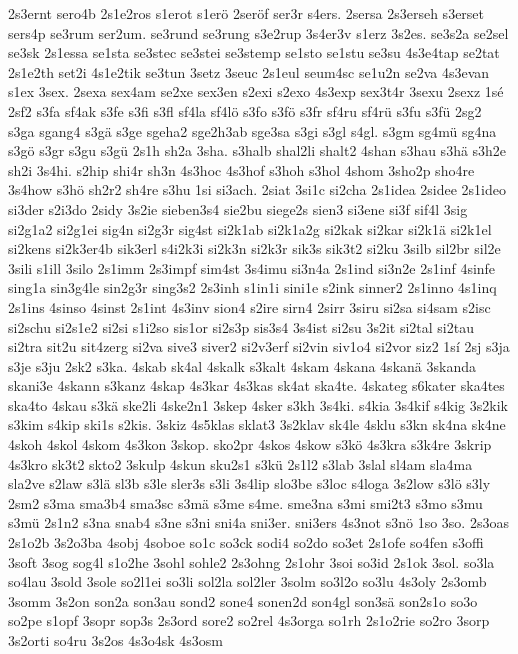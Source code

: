 {2s3ernt
sero4b
2s1e2ros
s1erot
s1erö
2seröf
ser3r
s4ers.
2sersa
2s3erseh
s3erset
sers4p
se3rum
ser2um.
se3rund
se3rung
s3e2rup
3s4er3v
s1erz
3s2es.
se3s2a
se2sel
se3sk
2s1essa
se1sta
se3stec
se3stei
se3stemp
se1sto
se1stu
se3su
4s3e4tap
se2tat
2s1e2th
set2i
4s1e2tik
se3tun
3setz
3seuc
2s1eul
seum4sc
se1u2n
se2va
4s3evan
s1ex
3sex.
2sexa
sex4am
se2xe
sex3en
s2exi
s2exo
4s3exp
sex3t4r
3sexu
2sexz
1sé
2sf2
s3fa
sf4ak
s3fe
s3fi
s3fl
sf4la
sf4lö
s3fo
s3fö
s3fr
sf4ru
sf4rü
s3fu
s3fü
2sg2
s3ga
sgang4
s3gä
s3ge
sgeha2
sge2h3ab
sge3sa
s3gi
s3gl
s4gl.
s3gm
sg4mü
sg4na
s3gö
s3gr
s3gu
s3gü
2s1h
sh2a
3sha.
s3halb
shal2li
shalt2
4shan
s3hau
s3hä
s3h2e
sh2i
3s4hi.
s2hip
shi4r
sh3n
4s3hoc
4s3hof
s3hoh
s3hol
4shom
3sho2p
sho4re
3s4how
s3hö
sh2r2
sh4re
s3hu
1si
si3ach.
2siat
3si1c
si2cha
2s1idea
2sidee
2s1ideo
si3der
s2i3do
2sidy
3s2ie
sieben3s4
sie2bu
siege2s
sien3
si3ene
si3f
sif4l
3sig
si2g1a2
si2g1ei
sig4n
si2g3r
sig4st
si2k1ab
si2k1a2g
si2kak
si2kar
si2k1ä
si2k1el
si2kens
si2k3er4b
sik3erl
s4i2k3i
si2k3n
si2k3r
sik3s
sik3t2
si2ku
3silb
sil2br
sil2e
3sili
s1ill
3silo
2s1imm
2s3impf
sim4st
3s4imu
si3n4a
2s1ind
si3n2e
2s1inf
4sinfe
sing1a
sin3g4le
sin2g3r
sing3s2
2s3inh
s1in1i
sini1e
s2ink
sinner2
2s1inno
4s1inq
2s1ins
4sinso
4sinst
2s1int
4s3inv
sion4
s2ire
sirn4
2sirr
3siru
si2sa
si4sam
s2isc
si2schu
si2s1e2
si2si
s1i2so
sis1or
si2s3p
sis3s4
3s4ist
si2su
3s2it
si2tal
si2tau
si2tra
sit2u
sit4zerg
si2va
sive3
siver2
si2v3erf
si2vin
siv1o4
si2vor
siz2
1sí
2sj
s3ja
s3je
s3ju
2sk2
s3ka.
4skab
sk4al
4skalk
s3kalt
4skam
4skana
4skanä
3skanda
skani3e
4skann
s3kanz
4skap
4s3kar
4s3kas
sk4at
ska4te.
4skateg
s6kater
ska4tes
ska4to
4skau
s3kä
ske2li
4ske2n1
3skep
4sker
s3kh
3s4ki.
s4kia
3s4kif
s4kig
3s2kik
s3kim
s4kip
ski1s
s2kis.
3skiz
4s5klas
sklat3
3s2klav
sk4le
4sklu
s3kn
sk4na
sk4ne
4skoh
4skol
4skom
4s3kon
3skop.
sko2pr
4skos
4skow
s3kö
4s3kra
s3k4re
3skrip
4s3kro
sk3t2
skto2
3skulp
4skun
sku2s1
s3kü
2s1l2
s3lab
3slal
sl4am
sla4ma
sla2ve
s2law
s3lä
sl3b
s3le
sler3s
s3li
3s4lip
slo3be
s3loc
s4loga
3s2low
s3lö
s3ly
2sm2
s3ma
sma3b4
sma3sc
s3mä
s3me
s4me.
sme3na
s3mi
smi2t3
s3mo
s3mu
s3mü
2s1n2
s3na
snab4
s3ne
s3ni
sni4a
sni3er.
sni3ers
4s3not
s3nö
1so
3so.
2s3oas
2s1o2b
3s2o3ba
4sobj
4soboe
so1c
so3ck
sodi4
so2do
so3et
2s1ofe
so4fen
s3offi
3soft
3sog
sog4l
s1o2he
3sohl
sohle2
2s3ohng
2s1ohr
3soi
so3id
2s1ok
3sol.
so3la
so4lau
3sold
3sole
so2l1ei
so3li
sol2la
sol2ler
3solm
so3l2o
so3lu
4s3oly
2s3omb
3somm
3s2on
son2a
son3au
sond2
sone4
sonen2d
son4gl
son3sä
son2s1o
so3o
so2pe
s1opf
3sopr
sop3s
2s3ord
sore2
so2rel
4s3orga
so1rh
2s1o2rie
so2ro
3sorp
3s2orti
so4ru
3s2os
4s3o4sk
4s3osm
}
